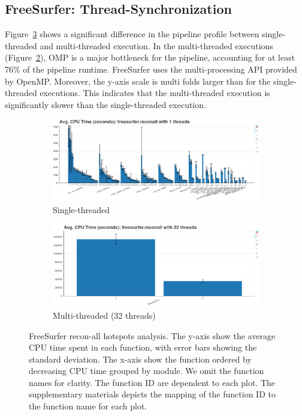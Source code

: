 \documentclass[conference]{IEEEtran}
\begin{document}
\subsection{FreeSurfer: Thread-Synchronization}
Figure~\ref{fig:hotspots-freesurfer-reconall} shows a significant difference in the pipeline profile between single-threaded and multi-threaded execution. In the multi-threaded executions (Figure~\ref{subfig:hotspots-freesurfer-reconall-32threads}), OMP is a major bottleneck for the pipeline, accounting for at least 76\% of the pipeline runtime. FreeSurfer uses the multi-processing API provided by OpenMP. Moreover, the y-axis scale is multi folds larger than for the single-threaded executions. This indicates that the multi-threaded execution is significantly slower than the single-threaded execution.
					
\begin{figure}
	\centering
	\begin{subfigure}[t]{0.49\textwidth}
		\caption{Single-threaded}
		\label{subfig:hotspots-freesurfer-reconall-1thread}
		\includegraphics[width=\textwidth]{figures/hotspots-1threads-freesurfer-reconall-simple.png}
	\end{subfigure}
	\begin{subfigure}[t]{0.49\textwidth}
		\caption{Multi-threaded (32 threads)}
		\label{subfig:hotspots-freesurfer-reconall-32threads}
		\includegraphics[width=\textwidth]{figures/hotspots-32threads-freesurfer-reconall-simple.png}
	\end{subfigure}
	\caption{FreeSurfer recon-all hotspots analysis. The y-axis show the average CPU time spent in each function, with error bars showing the standard deviation. The x-axis show the function ordered by decreasing CPU time grouped by module. We omit the function names for clarity. The function ID are dependent to each plot. The supplementary materials depicts the mapping of the function ID to the function name for each plot.}
	\label{fig:hotspots-freesurfer-reconall}
\end{figure}
			
\end{document}
